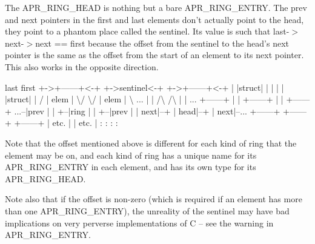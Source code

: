 The A\-P\-R\-\_\-\-R\-I\-N\-G\-\_\-\-H\-E\-A\-D is nothing but a bare A\-P\-R\-\_\-\-R\-I\-N\-G\-\_\-\-E\-N\-T\-R\-Y. The prev and next pointers in the first and last elements don't actually point to the head, they point to a phantom place called the sentinel. Its value is such that last-\/$>$next-\/$>$next == first because the offset from the sentinel to the head's next pointer is the same as the offset from the start of an element to its next pointer. This also works in the opposite direction.


\begin{DoxyPre}
       last                            first
    +->+------+<-+  +->sentinel<-+  +->+------+<-+
    |  |struct|  |  |            |  |  |struct|  |
   /   | elem |   \textbackslash{}/              \textbackslash{}/   | elem |  \textbackslash{}
...    |      |   /\textbackslash{}              /\textbackslash{}   |      |   ...
       +------+  |  |  +------+  |  |  +------+
  ...--|prev  |  |  +--|ring  |  |  +--|prev  |
       |  next|--+     |  head|--+     |  next|--...
       +------+        +------+        +------+
       | etc. |                        | etc. |
       :      :                        :      :
\end{DoxyPre}


Note that the offset mentioned above is different for each kind of ring that the element may be on, and each kind of ring has a unique name for its A\-P\-R\-\_\-\-R\-I\-N\-G\-\_\-\-E\-N\-T\-R\-Y in each element, and has its own type for its A\-P\-R\-\_\-\-R\-I\-N\-G\-\_\-\-H\-E\-A\-D.

Note also that if the offset is non-\/zero (which is required if an element has more than one A\-P\-R\-\_\-\-R\-I\-N\-G\-\_\-\-E\-N\-T\-R\-Y), the unreality of the sentinel may have bad implications on very perverse implementations of C -- see the warning in A\-P\-R\-\_\-\-R\-I\-N\-G\-\_\-\-E\-N\-T\-R\-Y.


